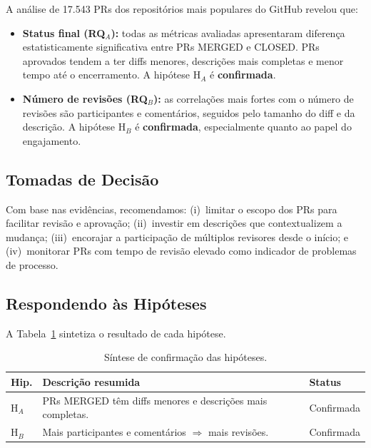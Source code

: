 \documentclass[10pt,a4paper,twocolumn]{article}
\begin{document}
A análise de 17.543 PRs dos repositórios mais populares do GitHub revelou que:

\begin{itemize}
  \item \textbf{Status final (RQ$_A$):} todas as métricas avaliadas
    apresentaram diferença estatisticamente significativa entre PRs MERGED
    e CLOSED. PRs aprovados tendem a ter diffs menores, descrições mais
    completas e menor tempo até o encerramento.
    A hipótese H$_A$ é \textbf{confirmada}.

  \item \textbf{Número de revisões (RQ$_B$):} as correlações mais fortes
    com o número de revisões são participantes e comentários, seguidos pelo
    tamanho do diff e da descrição. A hipótese H$_B$ é
    \textbf{confirmada}, especialmente quanto ao papel do engajamento.
\end{itemize}

\subsection{Tomadas de Decisão}

Com base nas evidências, recomendamos: (i)~limitar o escopo dos PRs para
facilitar revisão e aprovação; (ii)~investir em descrições que
contextualizem a mudança; (iii)~encorajar a participação de múltiplos
revisores desde o início; e (iv)~monitorar PRs com tempo de revisão
elevado como indicador de problemas de processo.

\subsection{Respondendo às Hipóteses}

A Tabela~\ref{tab:hipoteses} sintetiza o resultado de cada hipótese.

\begin{table}[H]
  \centering
  \caption{Síntese de confirmação das hipóteses.}
  \label{tab:hipoteses}
  \small
  \begin{tabularx}{\columnwidth}{lXl}
    \toprule
    Hip. & Descrição resumida & Status \\
    \midrule
    H$_A$ & PRs MERGED têm diffs menores e descrições mais completas. & Confirmada \\
    H$_B$ & Mais participantes e comentários $\Rightarrow$ mais revisões. & Confirmada \\
    \bottomrule
  \end{tabularx}
\end{table}
\end{document}
